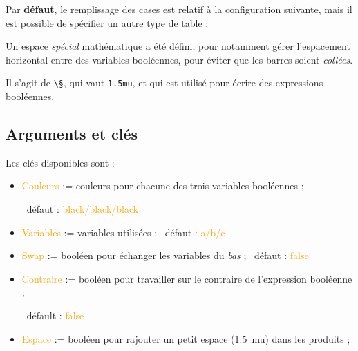 \documentclass[french,a4paper,11pt]{article}
\newcommand\Cle[1]{{\small\sffamily\textlangle \textcolor{orange}{#1}\textrangle}}
\begin{document}
{{\begin{importantblock}
Par \textbf{défaut}, le remplissage des cases est relatif à la configuration suivante, mais il est possible de spécifier un autre type de table :

\begin{center}
	\begin{TableKarnaugh}
	\end{TableKarnaugh}
\end{center}
\end{importantblock}

\begin{tipblock}
Un espace \textit{spécial} mathématique a été défini, pour notamment gérer l'espacement horizontal entre des variables booléennes, pour éviter que les barres soient \textit{collées}.

Il s'agit de \texttt{\textbackslash §}, qui vaut \texttt{1.5mu}, et qui est utilisé pour écrire des expressions booléennes.
\end{tipblock}

\pagebreak

\subsection{Arguments et clés }

\begin{DemoCode}
\end{DemoCode}

\begin{tipblock}
Les clés disponibles sont :

\begin{itemize}
	\item \Cle{Couleurs} := couleurs pour chacune des trois variables booléennes ;
	
	\hfill~défaut : \Cle{black/black/black}
	\item \Cle{Variables} := variables utilisées ; \hfill~défaut : \Cle{a/b/c}
	\item \Cle{Swap} := booléen pour échanger les variables du \textit{bas} ; \hfill~défaut : \Cle{false}
	\item \Cle{Contraire} := booléen pour travailler sur le contraire de l'expression booléenne ;
	
	\hfill~défault : \Cle{false}
	\item \Cle{Espace} := booléen pour rajouter un petit espace (1.5~mu) dans les produits ;
	

\end{itemize}
\end{tipblock}}}
\end{document}
